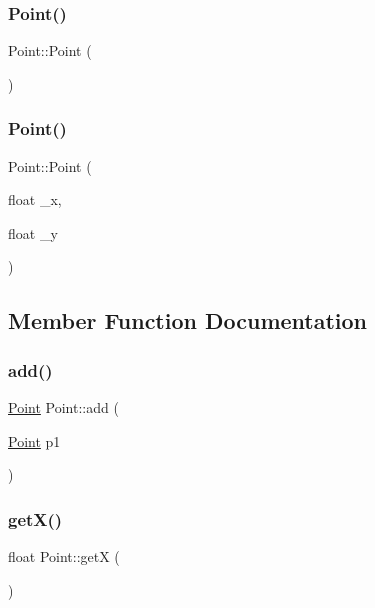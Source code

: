 \subsubsection{\texorpdfstring{Point()}{Point()}\hspace{0.1cm}{\footnotesize\ttfamily [1/2]}}
{\footnotesize\ttfamily Point\+::\+Point (\begin{DoxyParamCaption}{ }\end{DoxyParamCaption})}

\mbox{\label{class_point_a6524332fa4d321ff0a001366a732c7b6}} 
\subsubsection{\texorpdfstring{Point()}{Point()}\hspace{0.1cm}{\footnotesize\ttfamily [2/2]}}
{\footnotesize\ttfamily Point\+::\+Point (\begin{DoxyParamCaption}\item[{float}]{\+\_\+x,  }\item[{float}]{\+\_\+y }\end{DoxyParamCaption})}



\subsection{Member Function Documentation}
\mbox{\label{class_point_a9dbea84b07b0a8ec3bbb9e58b3d15899}} 
\subsubsection{\texorpdfstring{add()}{add()}}
{\footnotesize\ttfamily \hyperlink{class_point}{Point} Point\+::add (\begin{DoxyParamCaption}\item[{\hyperlink{class_point}{Point}}]{p1 }\end{DoxyParamCaption})}

\mbox{\label{class_point_acc27466778cc87a662bba40268c4c0c8}} 
\subsubsection{\texorpdfstring{get\+X()}{getX()}}
{\footnotesize\ttfamily float Point\+::getX (\begin{DoxyParamCaption}{ }\end{DoxyParamCaption})}

